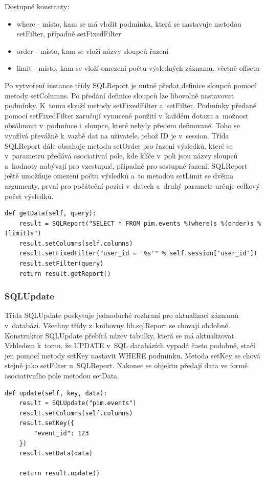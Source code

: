 \documentclass[bc,male,html,dept460]{diploma}				%
\begin{document}
Dostupné konstanty:
\begin{itemize}
 \item where - místo, kam se má vložit podmínka, která se nastavuje metodou setFilter, případně setFixedFilter
 \item order - místo, kam se vloží názvy sloupců řazení
 \item limit - místo, kam se vloží omezení počtu výsledných záznamů, včetně offsetu
\end{itemize}

Po vytvoření instance třídy SQLReport je nutné předat definice sloupců pomocí metody setColumns.
Po předání definice sloupců lze libovolně nastavovat podmínky. K~tomu slouží metody setFixedFilter a~setFilter.
Podmínky předané pomocí setFixedFilter zaručují vynucené použití v~každém dotazu a~možnost obsáhnout v~podmínce i~sloupce, které nebyly předem definované. Toho se využívá převážně k~vazbě dat na uživatele, jehož ID je v~session.
Třída SQLReport dále obsahuje metodu setOrder pro řazení výsledků, které se v~parametru předává asociativní pole, kde klíče v~poli jsou názvy sloupců a~hodnoty nabývají  pro vzestupné, případně  pro sestupné řazení.
SQLReport ještě umožňuje omezení počtu výsledků a~to metodou setLimit se dvěma argumenty, první pro počáteční pozici v~datech a~druhý parametr určuje celkový počet výsledků.
\bigskip
\begin{lstlisting}[label=src:Python,caption=Ukázka použití třídy SQLReport]
def getData(self, query):
	result = SQLReport("SELECT * FROM pim.events %(where)s %(order)s %(limit)s")
	result.setColumns(self.columns)
	result.setFixedFilter("user_id = '%s'" % self.session['user_id']) 
	result.setFilter(query)
	return result.getReport()
\end{lstlisting}
\newpage
\subsubsection{SQLUpdate}
Třída SQLUpdate poskytuje jednoduché rozhraní pro aktualizaci záznamů v~databázi. Všechny třídy z~knihovny lib.sqlReport se chovají obdobně. Konstruktor SQLUpdate přebírá název tabulky, která se má aktualizovat.
Vzhledem k~tomu, že UPDATE v~SQL databázích vypadá často podobně, stačí jen pomocí metody setKey nastavit WHERE podmínku. Metoda setKey se chová stejně jako setFilter u~SQLReport. Nakonec se objektu předají data ve formě asociativního pole metodou setData.
\bigskip
\begin{lstlisting}[label=src:Python,caption=Ukázka použití třídy SQLUpdate]
def update(self, key, data):
	result = SQLUpdate("pim.events")
	result.setColumns(self.columns)
	result.setKey({
		"event_id": 123
	})
	result.setData(data)
	
	return result.update()
\end{lstlisting}
\end{document}
